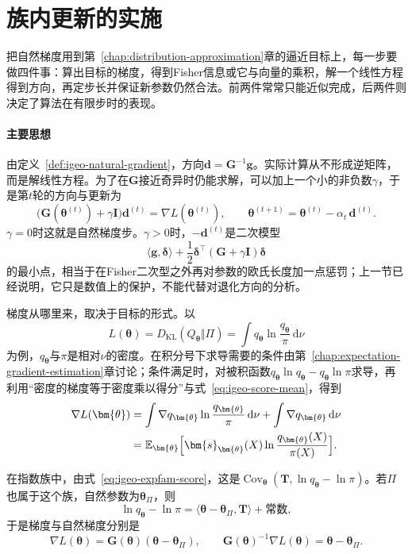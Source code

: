 \section{族内更新的实施}
\label{sec:igeo-implementation}

把自然梯度用到第~\ref{chap:distribution-approximation}章的逼近目标上，每一步要做四件事：算出目标的梯度，得到Fisher信息或它与向量的乘积，解一个线性方程得到方向，再定步长并保证新参数仍然合法。前两件常常只能近似完成，后两件则决定了算法在有限步时的表现。

\paragraph{主要思想}
由定义~\ref{def:igeo-natural-gradient}，方向$\bm{d}=\bm{G}^{-1}\bm{g}$。实际计算从不形成逆矩阵，而是解线性方程。为了在$\bm{G}$接近奇异时仍能求解，可以加上一个小的非负数$\gamma$，于是第$t$轮的方向与更新为
\begin{equation}
  \bigl(\bm{G}(\bm{\theta}^{(t)})+\gamma\bm{I}\bigr)\bm{d}^{(t)}=\nabla L(\bm{\theta}^{(t)}),\qquad
  \bm{\theta}^{(t+1)}=\bm{\theta}^{(t)}-\alpha_{t}\,\bm{d}^{(t)}.
  \label{eq:igeo-ngd-update}
\end{equation}
$\gamma=0$时这就是自然梯度步。$\gamma>0$时，$-\bm{d}^{(t)}$是二次模型
\[
  \langle\bm{g},\bm{\delta}\rangle+\frac12\bm{\delta}^{\top}(\bm{G}+\gamma\bm{I})\bm{\delta}
\]
的最小点，相当于在Fisher二次型之外再对参数的欧氏长度加一点惩罚；上一节已经说明，它只是数值上的保护，不能代替对退化方向的分析。

梯度从哪里来，取决于目标的形式。以
\[
  L(\bm{\theta})=D_{\mathrm{KL}}(Q_{\bm{\theta}}\Vert\Pi)=\int q_{\bm{\theta}}\ln\frac{q_{\bm{\theta}}}{\pi}\,\mathrm{d}\nu
\]
为例，$q_{\bm{\theta}}$与$\pi$是相对$\nu$的密度。在积分号下求导需要的条件由第~\ref{chap:expectation-gradient-estimation}章讨论；条件满足时，对被积函数$q_{\bm{\theta}}\ln q_{\bm{\theta}}-q_{\bm{\theta}}\ln\pi$求导，再利用“密度的梯度等于密度乘以得分”与式~\eqref{eq:igeo-score-mean}，得到
\[
  \begin{aligned}
    \nabla L(\bm{\theta})&=\int\nabla q_{\bm{\theta}}\ln\frac{q_{\bm{\theta}}}{\pi}\,\mathrm{d}\nu+\int\nabla q_{\bm{\theta}}\,\mathrm{d}\nu\\
    &=\mathbb{E}_{\bm{\theta}}\Bigl[\bm{s}_{\bm{\theta}}(X)\ln\frac{q_{\bm{\theta}}(X)}{\pi(X)}\Bigr].
  \end{aligned}
\]

在指数族中，由式~\eqref{eq:igeo-expfam-score}，这是$\operatorname{Cov}_{\bm{\theta}}(\bm{T},\ln q_{\bm{\theta}}-\ln\pi)$。若$\Pi$也属于这个族，自然参数为$\bm{\theta}_{\Pi}$，则
\[
  \ln q_{\bm{\theta}}-\ln\pi=\langle\bm{\theta}-\bm{\theta}_{\Pi},\bm{T}\rangle+\text{常数},
\]
于是梯度与自然梯度分别是
\[
  \nabla L(\bm{\theta})=\bm{G}(\bm{\theta})(\bm{\theta}-\bm{\theta}_{\Pi}),\qquad\bm{G}(\bm{\theta})^{-1}\nabla L(\bm{\theta})=\bm{\theta}-\bm{\theta}_{\Pi}.
\]

